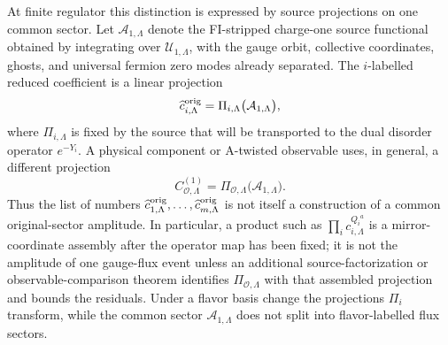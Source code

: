 At finite regulator this distinction is expressed by source projections on one
common sector.  Let \({\mathcal A}_{1,\Lambda}\) denote the
FI-stripped charge-one source functional obtained by integrating over
\(\mathcal U_{1,\Lambda}\), with the gauge orbit, collective coordinates,
ghosts, and universal fermion zero modes already separated.  The
\(i\)-labelled reduced coefficient is a linear projection
\begin{equation}
  \widehat c^{\rm orig}_{i,\Lambda}
  =
  \Pi_{i,\Lambda}\bigl({\mathcal A}_{1,\Lambda}\bigr),
  \label{eq:glsm-common-flux-source-projection}
\end{equation}
where \(\Pi_{i,\Lambda}\) is fixed by the source that will be transported to
the dual disorder operator \(e^{-Y_i}\).  A physical component or A-twisted
observable uses, in general, a different projection
\[
  C_{\mathcal O,\Lambda}^{(1)}
  =
  \Pi_{\mathcal O,\Lambda}\bigl({\mathcal A}_{1,\Lambda}\bigr).
\]
Thus the list of numbers
\(\widehat c^{\rm orig}_{1,\Lambda},\ldots,\widehat c^{\rm orig}_{m,\Lambda}\)
is not itself a construction of a common original-sector amplitude.  In
particular, a product such as \(\prod_i c_{i,\Lambda}^{Q_i{}^a}\) is a
mirror-coordinate assembly after the operator map has been fixed; it is not the
amplitude of one gauge-flux event unless an additional source-factorization or
observable-comparison theorem identifies \(\Pi_{\mathcal O,\Lambda}\) with
that assembled projection and bounds the residuals.  Under a flavor basis
change the projections \(\Pi_i\) transform, while the common sector
\({\mathcal A}_{1,\Lambda}\) does not split into flavor-labelled flux sectors.

